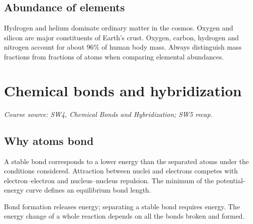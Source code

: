\documentclass[a4paper,10pt]{article}
\newcommand{\source}[1]{{\small\textit{Course source: #1.}\par}}
\newcommand{\chapterbreak}{\clearpage}
\begin{document}
\subsection{Abundance of elements}
Hydrogen and helium dominate ordinary matter in the cosmos. Oxygen and silicon
are major constituents of Earth's crust. Oxygen, carbon, hydrogen and nitrogen
account for about $96\%$ of human body mass. Always distinguish mass fractions
from fractions of atoms when comparing elemental abundances.

\chapterbreak
\section{Chemical bonds and hybridization}
\label{sec:bonds}
\source{SW4, Chemical Bonds and Hybridization; SW5 recap}

\subsection{Why atoms bond}
A stable bond corresponds to a lower energy than the separated atoms under
the conditions considered. Attraction between nuclei and electrons competes
with electron--electron and nucleus--nucleus repulsion. The minimum of the
potential-energy curve defines an equilibrium bond length.

\begin{center}
\end{center}
Bond formation releases energy; separating a stable bond requires energy.
The energy change of a whole reaction depends on all the bonds broken and formed.
\end{document}
